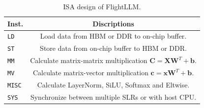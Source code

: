 \begin{table}[!tp]
    \caption{ISA design of FlightLLM.}\label{tab:ISA}
    \vspace{-10pt}
    \begin{tabular}{l|c}
    \toprule
    \textbf{Inst.} & \textbf{Discriptions} \\
    \midrule
    \texttt{LD}    & Load data from HBM or DDR to on-chip buffer. \\
    \texttt{ST}    & Store data from on-chip buffer to HBM or DDR. \\
    \texttt{MM}    & Calculate matrix-matrix multiplication $\textbf{C} = \textbf{XW}^T + \textbf{b}$. \\
    \texttt{MV}    & Calculate matrix-vector multiplication $\textbf{c} = \textbf{xW}^T + \textbf{b}$. \\
    \texttt{MISC}  & Calculate LayerNorm, SiLU, Softmax and Eltwise. \\
    \texttt{SYS}   & Synchronize between multiple SLRs or with host CPU. \\
    \bottomrule
    \end{tabular}
    \vspace{-10pt}
\end{table}